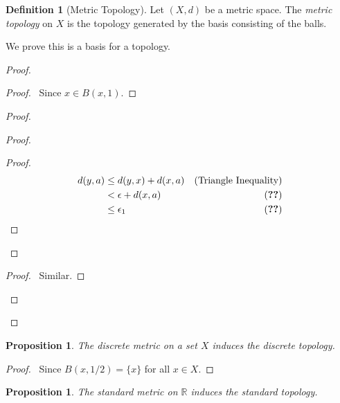 \documentclass{book}
\let\qed\relax
\newtheorem{prop}[ax]{Proposition}
\theoremstyle{definition}
\newtheorem{df}[ax]{Definition}
\begin{document}
\begin{df}[Metric Topology]
Let $(X,d)$ be a metric space. The \emph{metric topology} on $X$ is the topology generated by the basis consisting of the balls.

We prove this is a basis for a topology.
\end{df}

\begin{proof}
\pf
{}
\begin{proof}
	\pf\ Since $x \in B(x,1)$.
\end{proof}
\begin{proof}
	\begin{proof}
		\begin{proof}
			\pf
			\begin{align*}
				d(y,a) & \leq d(y,x) + d(x,a) & (\text{Triangle Inequality}) \\
				& < \epsilon + d(x,a) & (\text{\stepref{i}}) \\
				& \leq \epsilon_1 & (\text{\stepref{b}})
			\end{align*}
		\end{proof}
	\end{proof}
	\begin{proof}
		\pf\ Similar.
	\end{proof}
\end{proof}
\qed
\end{proof}

\begin{prop}
The discrete metric on a set $X$ induces the discrete topology.
\end{prop}

\begin{proof}
\pf\ Since $B(x, 1/2) = \{x\}$ for all $x \in X$. \qed
\end{proof}

\begin{prop}
The standard metric on $\mathbb{R}$ induces the standard topology.
\end{prop}
\end{document}

